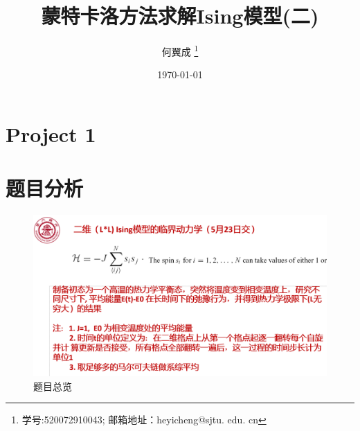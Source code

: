 \documentclass[UTF8,a4paper,10pt]{ctexart}
\title{\textbf{蒙特卡洛方法求解Ising模型(二)}}
\author{ 何翼成 \thanks{学号:520072910043; \newline
    邮箱地址：heyicheng@sjtu. edu. cn} }
\date{\today}
\begin{document}
\maketitle

\section*{Project 1}
\section{题目分析}
	\begin{figure}[!htbp]
		\centering
		\includegraphics[width=1\textwidth,height=0.6\textwidth]{pictures/pro.png}
		\caption{题目总览} \label{project1}
	\end{figure}
\end{document}
